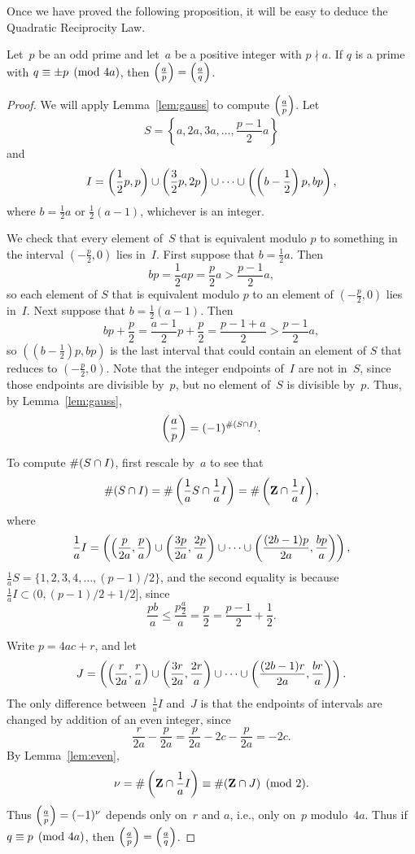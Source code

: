 Once we have proved the following
proposition, it will be easy to deduce the Quadratic Reciprocity Law.
\begin{proposition}[Euler]\label{prop:euler_prop}
Let~$p$ be an odd prime and let~$a$ be a positive integer with $p\nmid a$.
If $q$ is a prime with $q\equiv \pm p\pmod{4a}$, then
$\left(\frac{a}{p}\right) = \left(\frac{a}{q}\right)$.
\end{proposition}
\begin{proof}
We will apply Lemma~\ref{lem:gauss} to compute $\left(\frac{a}{p}\right)$.  Let
$$
S = \left\{a, 2a, 3a, \ldots, \frac{p-1}{2}a\right\}
$$
and
$$
I = \left(\frac{1}{2}p,p\right) \cup \left(\frac{3}{2}p, 2p\right)
  \cup \cdots \cup \left(\left(b-\frac{1}{2}\right)p,bp\right),
$$
where $b=\frac{1}{2}a$ or $\frac{1}{2}(a-1)$, whichever is an integer.

We check that every element of~$S$ that is equivalent modulo $p$ to something in the
interval $(-\frac{p}{2},0)$ lies in~$I$.
First suppose that $b=\frac{1}{2}a$.  Then
$$bp = \frac{1}{2}a p = \frac{p}{2} a > \frac{p-1}{2} a,$$ so each
element of $S$ that is equivalent modulo $p$ to an
element of $(-\frac{p}{2},0)$ lies in~$I$.
Next suppose that $b=\frac{1}{2}(a-1)$.  Then
$$
  bp+\frac{p}{2} = \frac{a-1}{2}p + \frac{p}{2} = \frac{p-1+a}{2}> \frac{p-1}{2}a,
$$ so $((b-\frac{1}{2})p,bp)$ is the
last interval that could contain an element of $S$ that reduces to
$(-\frac{p}{2},0)$.  Note that the integer endpoints of~$I$ are not
in~$S$, since those endpoints are divisible by~$p$, but no element
of~$S$ is divisible by~$p$.  Thus, by Lemma~\ref{lem:gauss},
$$\left(\frac{a}{p}\right) = (-1)^{\# (S\cap I)}.$$

To compute $\#(S\cap I)$, first rescale by~$a$ to see that
$$
\#(S\cap I) = \#\left(\frac{1}{a} S \cap \frac{1}{a}I\right)
 = \#\left(\mathbf{Z} \cap \frac{1}{a}I\right),
$$
where
$$\frac{1}{a} I = \left(\left(\frac{p}{2a},\frac{p}{a}\right) \cup \left(\frac{3p}{2a},\frac{2p}{a}\right) \cup \cdots \cup \left(\frac{(2b-1)p}{2a},\frac{bp}{a}\right) \right),$$
$\frac{1}{a}S = \{1,2,3,4,\ldots,(p-1)/2\}$, and
the second equality is because $\frac{1}{a} I \subset (0,(p-1)/2 + 1/2]$,
since $$\frac{pb}{a} \leq \frac{p \frac{a}{2}}{a} = \frac{p}{2} =
\frac{p-1}{2}+\frac{1}{2}.$$

Write $p=4ac+r$, and let
$$
J = \left(\left(\frac{r}{2a},\frac{r}{a}\right) \cup \left(\frac{3r}{2a},\frac{2r}{a}\right) \cup \cdots \cup \left(\frac{(2b-1)r}{2a},\frac{br}{a}\right) \right).
$$
The only difference between~$\frac{1}{a}I$ and~$J$ is that the endpoints of
intervals are changed by addition of an even integer,
since
$$
\frac{r}{2a} - \frac{p}{2a} = \frac{p}{2a} - 2c - \frac{p}{2a} = -2c.
$$
  By
Lemma~\ref{lem:even},
$$
  \nu=\#\left(\mathbf{Z} \cap \frac{1}{a}I\right) \equiv \#(\mathbf{Z}\cap J)\pmod{2}.
$$
Thus $\left(\frac{a}{p}\right)=(-1)^\nu$ depends only on~$r$ and $a$, i.e., only
on~$p$ modulo~$4a$.  Thus if $q\equiv p\pmod{4a}$, then
$\left(\frac{a}{p}\right)=\left(\frac{a}{q}\right)$.


\end{proof}
